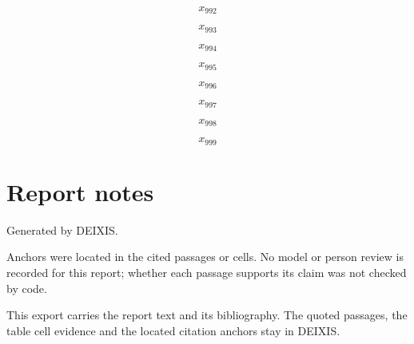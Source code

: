 \documentclass[journal]{IEEEtran}
\begin{document}
\begin{equation}
\label{eq:EQ992}
x_{992}
\end{equation}
\cite{Synth26}

\begin{equation}
\label{eq:EQ993}
x_{993}
\end{equation}
\cite{Synth26}

\begin{equation}
\label{eq:EQ994}
x_{994}
\end{equation}
\cite{Synth26}

\begin{equation}
\label{eq:EQ995}
x_{995}
\end{equation}
\cite{Synth26}

\begin{equation}
\label{eq:EQ996}
x_{996}
\end{equation}
\cite{Synth26}

\begin{equation}
\label{eq:EQ997}
x_{997}
\end{equation}
\cite{Synth26}

\begin{equation}
\label{eq:EQ998}
x_{998}
\end{equation}
\cite{Synth26}

\begin{equation}
\label{eq:EQ999}
x_{999}
\end{equation}
\cite{Synth26}

\section*{Report notes}

Generated by DEIXIS.

Anchors were located in the cited passages or cells. No model or person review is recorded for this report; whether each passage supports its claim was not checked by code.

This export carries the report text and its bibliography. The quoted passages, the table cell evidence and the located citation anchors stay in DEIXIS.




\end{document}
